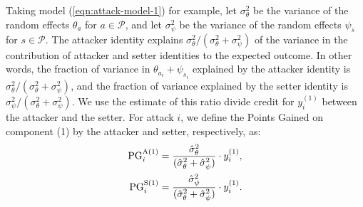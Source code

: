 \documentclass{article}
\begin{document}
Taking model (\ref{eqn:attack-model-1}) for example, let $\sigma^2_\theta$ be the variance of the random effects $\theta_a$ for $a \in \mathcal{P}$, and let $\sigma^2_\psi$ be the variance of the random effects $\psi_s$ for $s \in \mathcal P$. The attacker identity explains $\sigma^2_\theta / (\sigma^2_\theta + \sigma^2_\psi)$ of the variance in the contribution of attacker and setter identities to the expected outcome. In other words, the fraction of variance in $\theta_{a_i} + \psi_{s_i}$ explained by the attacker identity is $\sigma^2_\theta / (\sigma^2_\theta + \sigma^2_\psi)$, and the fraction of variance explained by the setter identity is $\sigma^2_\psi / (\sigma^2_\theta + \sigma^2_\psi)$. We use the estimate of this ratio divide credit for $y_i^{(1)}$ between the attacker and the setter. For attack $i$, we define the Points Gained on component (1) by the attacker and setter, respectively, as:
\begin{align}
    \label{eqn:pg-attack-1}
    \begin{split}
        \mbox{PG}_i^{\mbox{\scriptsize A(1)}} &= \frac{\hat\sigma^2_\theta}{(\hat\sigma^2_\theta + \hat\sigma^2_\psi)} \cdot y_i^{(1)},\\
        \mbox{PG}_i^{\mbox{\scriptsize S(1)}} &= \frac{\hat\sigma^2_\psi}{(\hat\sigma^2_\theta + \hat\sigma^2_\psi)} \cdot y_i^{(1)}.
    \end{split}
\end{align}
\end{document}
